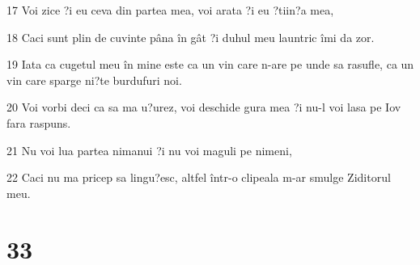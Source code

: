 \par 17 Voi zice ?i eu ceva din partea mea, voi arata ?i eu ?tiin?a mea,
\par 18 Caci sunt plin de cuvinte pâna în gât ?i duhul meu launtric îmi da zor.
\par 19 Iata ca cugetul meu în mine este ca un vin care n-are pe unde sa rasufle, ca un vin care sparge ni?te burdufuri noi.
\par 20 Voi vorbi deci ca sa ma u?urez, voi deschide gura mea ?i nu-l voi lasa pe Iov fara raspuns.
\par 21 Nu voi lua partea nimanui ?i nu voi maguli pe nimeni,
\par 22 Caci nu ma pricep sa lingu?esc, altfel într-o clipeala m-ar smulge Ziditorul meu.

\chapter{33}

